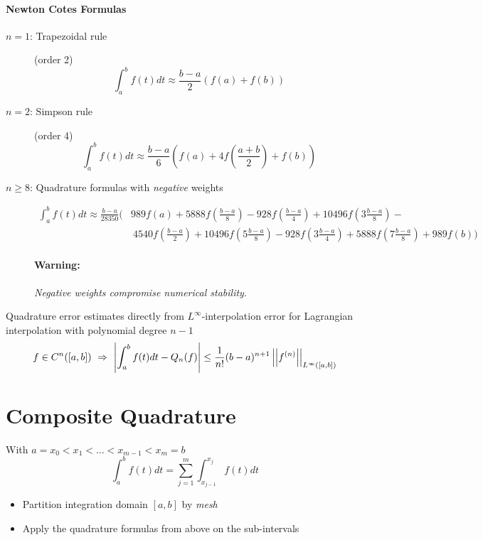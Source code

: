 	\paragraph{Newton Cotes Formulas}
		\begin{description}
			\item[$n=1$: Trapezoidal rule] (order 2)
			\[
			\int_a^b f(t) dt \approx \frac{b-a}{2}(f(a)+f(b))
			\]
			\item[$n=2$: Simpson rule] (order 4)
			\[
			\int_a^b f(t) dt \approx \frac{b-a}{6} \left( f(a)+4f\left( \frac{a+b}{2}\right)+f(b)\right)
			\]
			\item[$n\geq 8$: Quadrature formulas with \emph{negative} weights]
			\begin{align*}
			 \int_a^b f(t) dt \approx \frac{b-a}{28350}
				\Biggl(
					&989 f(a)+5888f\left(\frac{b-a}{8}\right) -
					928 f\left(\frac{b-a}{4}\right) + 
					10496f\left(3\frac{b-a}{8}\right)-\\
					&\ 4540 f\left(\frac{b-a}{2}\right)+
					10496f\left(5\frac{b-a}{8}\right)
					-928 f\left(3\frac{b-a}{4}\right)+
					5888f\left(7\frac{b-a}{8}\right)+
					989f\left(b\right)
				\Biggr)
			\end{align*}
			\paragraph{Warning:} \emph{Negative weights compromise numerical stability}.
		\end{description}
	\begin{fmerke}
	 Quadrature error estimates directly from $L^\infty$-interpolation error for Lagrangian interpolation with polynomial degree $n-1$
	 \[
	  f \in C^n([a,b]) \ \Rightarrow  \ \left| \int_a^b f(t) dt - Q_n (f) \right| \leq \frac{1}{n!}(b-a)^{n+1} \left|\left| f^{(n)} \right|\right|_{L^\infty([a,b])}
	 \]

	\end{fmerke}

\section{Composite Quadrature}
	With $a = x_0 < x_1 < \ldots < x_{m-1} < x_m =b$
	\[
	 \int_a^b f(t) dt = \sum_{j=1}^m \int_{x_{j-1}}^{x_j} f(t) dt
	\]
	\begin{itemize}
	 \item Partition integration domain $[a,b]$ by \emph{mesh}
	 \item Apply the quadrature formulas from above on the sub-intervals
	\end{itemize}
	

